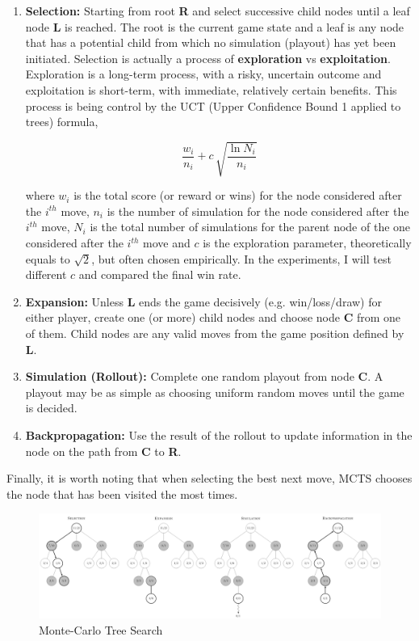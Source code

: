 \documentclass[twocolumn]{extarticle}
\begin{document}
\begin{enumerate}
\item \textbf{Selection:} Starting from root \textbf{R} and select successive child nodes until a leaf node \textbf{L} is reached. The root is the current game state and a leaf is any node that has a potential child from which no simulation (playout) has yet been initiated. Selection is actually a process of \textbf{exploration} vs \textbf{exploitation}. Exploration is a long-term process, with a risky, uncertain outcome and exploitation is short-term, with immediate, relatively certain benefits. This process is being control by the UCT (Upper Confidence Bound 1 applied to trees) formula,

\begin{equation}
\frac{w_i}{n_i}+c\,\sqrt{\frac{\ln N_i}{n_i}}
\label{eq: uct}
\end{equation}

where $w_i$ is the total score (or reward or wins) for the node considered after the $i^{th}$ move, $n_i$ is the number of simulation for the node considered after the $i^{th}$ move, $N_i$ is the total number of simulations for the parent node of the one considered after the $i^{th}$ move and $c$ is the exploration parameter, theoretically equals to $\sqrt{2}$, but often chosen empirically. In the experiments, I will test different $c$ and compared the final win rate.

\item \textbf{Expansion:} Unless \textbf{L} ends the game decisively (e.g. win/loss/draw) for either player, create one (or more) child nodes and choose node \textbf{C} from one of them. Child nodes are any valid moves from the game position defined by \textbf{L}.
\item \textbf{Simulation (Rollout):} Complete one random playout from node \textbf{C}. A playout may be as simple as choosing uniform random moves until the game is decided.
\item \textbf{Backpropagation:} Use the result of the rollout to update information in the node on the path from \textbf{C} to \textbf{R}.
\end{enumerate}

Finally, it is worth noting that when selecting the best next move, MCTS chooses the node that has been visited the most times.

\begin{figure}[H]
\centering
\includegraphics[width=0.95\linewidth]{"img/mcts"}
\caption{Monte-Carlo Tree Search}
\label{fig:mcts}
\end{figure}
\end{document}
